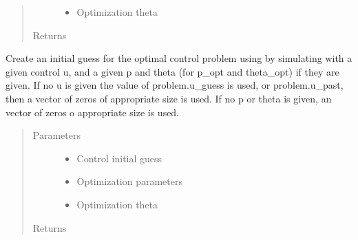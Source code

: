 \documentclass[letterpaper,10pt,english]{sphinxmanual}
\begin{document}
\begin{fulllineitems}
\begin{fulllineitems}
\begin{quote}
\begin{description}
\begin{itemize}
\item {} 
 \textendash{} Optimization theta

\end{itemize}

\item[{Returns}] \leavevmode


\end{description}\end{quote}

\end{fulllineitems}


\begin{fulllineitems}
\label{\detokenize{yaocptool.methods.base:yaocptool.methods.base.discretizationschemebase.DiscretizationSchemeBase.create_initial_guess_with_simulation}}
Create an initial guess for the optimal control problem using by simulating with a given control u,
and a given p and theta (for p\_opt and theta\_opt) if they are given.
If no u is given the value of problem.u\_guess is used, or problem.u\_past, then a vector of zeros of appropriate
size is used.
If no p or theta is given, an vector of zeros o appropriate size is used.
\begin{quote}\begin{description}
\item[{Parameters}] \leavevmode\begin{itemize}
\item {} 
 \textendash{} Control initial guess

\item {} 
 \textendash{} Optimization parameters

\item {} 
 \textendash{} Optimization theta

\end{itemize}

\item[{Returns}] \leavevmode


\end{description}\end{quote}


\end{fulllineitems}
\end{fulllineitems}
\end{document}
